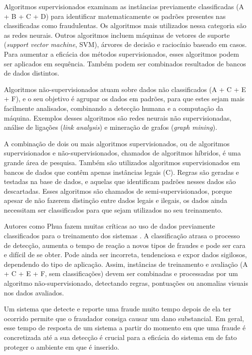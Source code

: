 Algoritmos supervisionados examinam as instâncias previamente classificadas (A + B + C + D) para identificar matematicamente os padrões presentes nas classificadas como fraudulentas. Os algoritmos mais utilizados nessa categoria são as redes neurais. Outros algoritmos incluem máquinas de vetores de suporte (\emph{support vector machine}, SVM), árvores de decisão e raciocínio baseado em casos. Para aumentar a eficácia dos métodos supervisionados, esses algoritmos podem ser aplicados em sequência. Também podem ser combinados resultados de bancos de dados distintos.

Algoritmos não-supervisionados atuam sobre dados não classificados (A + C + E + F), e o seu objetivo é agrupar os dados em padrões, para que estes sejam mais facilmente analisados, combinando a detecção humana e a computação da máquina. Exemplos desses algoritmos são redes neurais não supervisionadas, análise de ligações (\emph{link analysis}) e mineração de grafos (\emph{graph mining}).

A combinação de dois ou mais algoritmos supervisionados, ou de algoritmos supervisionados e não-supervisionados, chamados de algoritmos híbridos, é uma grande área de pesquisa. Também são utilizados algoritmos supervisionados em bancos de dados que contêm apenas instâncias legais (C). Regras são geradas e testadas na base de dados, e aquelas que identificam padrões nesses dados são descartadas. Esses algoritmos são chamados de semi-supervisionados, porque apesar de não fazerem distinção entre dados legais e ilegais, os dados ainda necessitam ser classificados para que sejam utilizados no seu treinamento.

Autores como Phua fazem muitas críticas ao uso de dados previamente classificados para o treinamento dos sistemas \cite{Phua2010}. A classificação atrasa o processo de detecção, aumenta o tempo de reação a novos tipos de fraudes e pode ser cara e difícil de se obter. Pode ainda ser incorreta, tendenciosa e expor dados sigilosos, dependendo do tipo de aplicação. Assim, instâncias de treinamento e avaliação (A + C + E + F, sem classificações) devem ser combinadas e processadas por um algoritmo não-supervisionado, detectando regras, pontuações ou anomalias visuais nos dados avaliados.

Um sistema que detecte e reporte uma fraude muito tempo depois de ela ter ocorrido permite que o fraudador consiga causar um dano substancial. Em geral, esse tempo de resposta de um sistema a partir do momento em que uma fraude é concretizada até a sua detecção é crucial para a eficácia do sistema em de fato proteger o ambiente em que é inserido.

